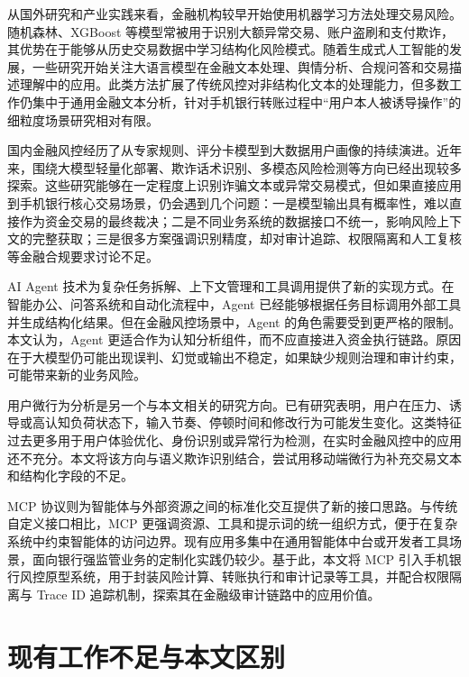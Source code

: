 \documentclass{xduugthesis}
\begin{document}
从国外研究和产业实践来看，金融机构较早开始使用机器学习方法处理交易风险。随机森林、XGBoost 等模型常被用于识别大额异常交易、账户盗刷和支付欺诈，其优势在于能够从历史交易数据中学习结构化风险模式\cite{bolton2002statistical,ngai2011application,dubey2025transformer}。随着生成式人工智能的发展\cite{vaswani2017attention,brown2020language}，一些研究开始关注大语言模型在金融文本处理、舆情分析、合规问答和交易描述理解中的应用。此类方法扩展了传统风控对非结构化文本的处理能力，但多数工作仍集中于通用金融文本分析，针对手机银行转账过程中“用户本人被诱导操作”的细粒度场景研究相对有限。

国内金融风控经历了从专家规则、评分卡模型到大数据用户画像的持续演进。近年来，围绕大模型轻量化部署、欺诈话术识别、多模态风险检测等方向已经出现较多探索\cite{nie2025multimodal}。这些研究能够在一定程度上识别诈骗文本或异常交易模式，但如果直接应用到手机银行核心交易场景，仍会遇到几个问题：一是模型输出具有概率性，难以直接作为资金交易的最终裁决；二是不同业务系统的数据接口不统一，影响风险上下文的完整获取；三是很多方案强调识别精度，却对审计追踪、权限隔离和人工复核等金融合规要求讨论不足\cite{anthropic2024mcp,wang2025compliance}。

AI Agent 技术为复杂任务拆解、上下文管理和工具调用提供了新的实现方式\cite{agnihotram2025agentic}。在智能办公、问答系统和自动化流程中，Agent 已经能够根据任务目标调用外部工具并生成结构化结果。但在金融风控场景中，Agent 的角色需要受到更严格的限制。本文认为，Agent 更适合作为认知分析组件，而不应直接进入资金执行链路。原因在于大模型仍可能出现误判、幻觉或输出不稳定，如果缺少规则治理和审计约束，可能带来新的业务风险。

用户微行为分析是另一个与本文相关的研究方向。已有研究表明，用户在压力、诱导或高认知负荷状态下，输入节奏、停顿时间和修改行为可能发生变化。这类特征过去更多用于用户体验优化、身份识别或异常行为检测，在实时金融风控中的应用还不充分。本文将该方向与语义欺诈识别结合\cite{li2024cognitive}，尝试用移动端微行为补充交易文本和结构化字段的不足。

MCP 协议则为智能体与外部资源之间的标准化交互提供了新的接口思路\cite{anthropic2024mcp}。与传统自定义接口相比，MCP 更强调资源、工具和提示词的统一组织方式，便于在复杂系统中约束智能体的访问边界。现有应用多集中在通用智能体中台或开发者工具场景，面向银行强监管业务的定制化实践仍较少\cite{anthropic2024mcp}。基于此，本文将 MCP 引入手机银行风控原型系统，用于封装风险计算、转账执行和审计记录等工具，并配合权限隔离与 Trace ID 追踪机制，探索其在金融级审计链路中的应用价值。

\section{现有工作不足与本文区别}
\end{document}
